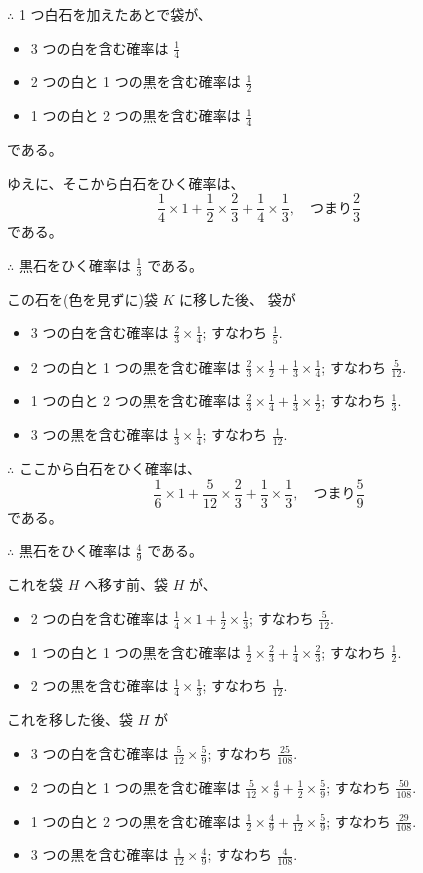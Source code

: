 $\therefore$ 1 つ白石を加えたあとで袋が、
\begin{itemize}
\item[] 3 つの白を含む確率は $\frac{1}{4}$
\item[] 2 つの白と 1 つの黒を含む確率は $\frac{1}{2}$
\item[] 1 つの白と 2 つの黒を含む確率は $\frac{1}{4}$
\end{itemize}
である。

ゆえに、そこから白石をひく確率は、
\[
\frac{1}{4} \times 1 + \frac{1}{2} \times \frac{2}{3}
 + \frac{1}{4} \times \frac{1}{3},
 \quad \mbox{つまり} \frac{2}{3}
\]
である。

$\therefore$ 黒石をひく確率は $\frac{1}{3}$ である。

この石を(色を見ずに)袋 $K$ に移した後、
袋が
\begin{itemize}
\item[]
3 つの白を含む確率は $\frac{2}{3} \times \frac{1}{4}$; すなわち $\frac{1}{5}$.
\item[]
2 つの白と 1 つの黒を含む確率は
$\frac{2}{3} \times \frac{1}{2} + \frac{1}{3} \times \frac{1}{4}$;
すなわち $\frac{5}{12}$.
\item[]
1 つの白と 2 つの黒を含む確率は
$\frac{2}{3} \times \frac{1}{4} + \frac{1}{3} \times \frac{1}{2}$;
すなわち $\frac{1}{3}$.
\item[]
3 つの黒を含む確率は $\frac{1}{3} \times \frac{1}{4}$;
すなわち $\frac{1}{12}$.
\end{itemize}

$\therefore$ ここから白石をひく確率は、
\[
\frac{1}{6} \times 1 + \frac{5}{12} \times \frac{2}{3}
 + \frac{1}{3} \times \frac{1}{3},
 \quad \mbox{つまり} \frac{5}{9}
\]
である。

$\therefore$ 黒石をひく確率は $\frac{4}{9}$ である。

これを袋 $H$ へ移す前、袋 $H$ が、
\begin{itemize}
\item[]
2 つの白を含む確率は
$\frac{1}{4} \times 1 + \frac{1}{2} \times \frac{1}{3}$;
すなわち $\frac{5}{12}$.
\item[]
1 つの白と 1 つの黒を含む確率は
$\frac{1}{2} \times \frac{2}{3} + \frac{1}{4} \times \frac{2}{3}$;
すなわち $\frac{1}{2}$.
\item[]
2 つの黒を含む確率は $\frac{1}{4} \times \frac{1}{3}$;
すなわち $\frac{1}{12}$.
\end{itemize}

これを移した後、袋 $H$ が
\begin{itemize}
\item[]
3 つの白を含む確率は $\frac{5}{12} \times \frac{5}{9}$;
すなわち $\frac{25}{108}$.
\item[]
2 つの白と 1 つの黒を含む確率は
$\frac{5}{12} \times \frac{4}{9} + \frac{1}{2} \times \frac{5}{9}$;
すなわち $\frac{50}{108}$.
\item[]
1 つの白と 2 つの黒を含む確率は
$\frac{1}{2} \times \frac{4}{9} + \frac{1}{12} \times \frac{5}{9}$;
すなわち $\frac{29}{108}$.
\item[]
3 つの黒を含む確率は $\frac{1}{12} \times \frac{4}{9}$;
すなわち $\frac{4}{108}$.
\end{itemize}

